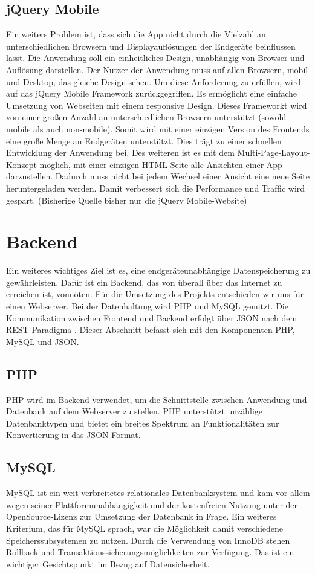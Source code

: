 \documentclass[10pt, conference, compsocconf]{IEEEtran}
\begin{document}
\subsection{jQuery Mobile}
Ein weiters Problem ist, dass sich die App nicht durch die Vielzahl an unterschiedlichen Browsern und Displayaufl\"osungen der Endger\"ate beinflussen l\"asst. 
Die Anwendung soll ein einheitliches Design, unabh\"angig von Browser und Aufl\"osung darstellen. 
Der Nutzer der Anwendung muss auf allen Browsern, mobil und Desktop, das gleiche Design sehen.
Um diese Anforderung zu erf\"ullen, wird auf das jQuery Mobile Framework zur\"uckgegriffen.
Es erm\"oglicht eine einfache Umsetzung von Webseiten mit einem responsive Design. Dieses Frameworkt wird von einer gro{\ss}en Anzahl an unterschiedlichen Browsern unterst\"utzt (sowohl mobile als auch non-mobile). 
Somit wird mit einer einzigen Version des Frontends eine gro{\ss}e Menge an Endger\"aten unterst\"utzt. Dies tr\"agt zu einer schnellen Entwicklung der Anwendung bei. 
Des weiteren ist es mit dem Multi-Page-Layout-Konzept m\"oglich, mit einer einzigen HTML-Seite alle Ansichten einer App darzustellen. 
Dadurch muss nicht bei jedem Wechsel einer Ansicht eine neue Seite heruntergeladen werden. Damit verbessert sich die Performance und Traffic wird gespart. (Bisherige Quelle bisher nur die jQuery Mobile-Website)

\section{Backend}
Ein weiteres wichtiges Ziel ist es, eine endger\"ateunabh\"angige Datenspeicherung zu gew\"ahrleisten. 
Daf\"ur ist ein Backend, das von \"uberall \"uber das Internet zu erreichen ist, vonn\"oten. 
F\"ur die Umsetzung des Projekts entschieden wir uns f\"ur einen Webserver. Bei der Datenhaltung wird PHP und MySQL genutzt. 
Die Kommunikation zwischen Frontend  und Backend erfolgt über JSON nach dem REST-Paradigma .  
Dieser Abschnitt befasst sich mit den Komponenten PHP, MySQL und JSON.

\subsection{PHP}
PHP wird im Backend verwendet, um die Schnittstelle zwischen Anwendung und Datenbank auf dem Webserver zu stellen. PHP unterst\"utzt unz\"ahlige Datenbanktypen und bietet ein breites Spektrum an Funktionalit\"aten zur Konvertierung in das JSON-Format.

\subsection{MySQL}
MySQL ist ein weit verbreitetes relationales Datenbanksystem und kam vor allem wegen seiner Platt\-formunabh\"angigkeit und der kostenfreien Nutzung unter der OpenSource-Lizenz zur Umsetzung der Datenbank in Frage. 
Ein weiteres Kriterium, das für MySQL sprach, war die M\"oglichkeit damit verschiedene Speicherssubsystemen zu nutzen. 
Durch die Verwendung von InnoDB stehen Rollback und Transaktionssicherungsm\"oglichkeiten zur Verf\"ugung. 
Das ist ein wichtiger Gesichtspunkt im Bezug auf Datensicherheit.
\end{document}
